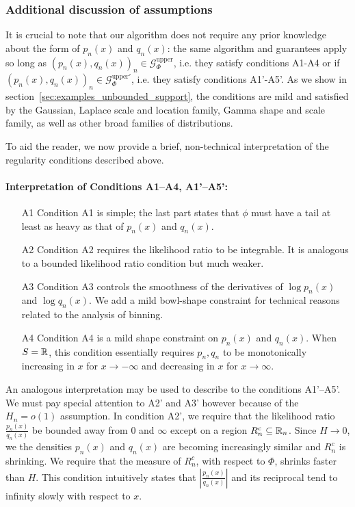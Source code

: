 \documentclass{article}
\begin{document}
\subsubsection{Additional discussion of assumptions}

It is crucial to note that our algorithm does not require any prior knowledge about the form of $p_n(x)$ and $q_n(x)$: the same algorithm and guarantees apply so long as $(p_n(x), q_n(x))_n \in \mathcal{G}^{\textrm{upper}}_\Phi$, i.e. they satisfy conditions A1-A4 or if  $(p_n(x), q_n(x))_n \in \mathcal{G}^{\textrm{upper}\prime}_\Phi$, i.e. they satisfy conditions A1'-A5'. As we show in section~\ref{sec:examples_unbounded_support}, the conditions are mild and satisfied by the Gaussian, Laplace scale and location family, Gamma shape and scale family, as well as other broad families of distributions.

To aid the reader, we now provide a brief, non-technical interpretation of the regularity conditions described above.

\paragraph{\textbf{Interpretation of Conditions A1--A4, A1'--A5':}}

\begin{enumerate}
\item[A1] Condition A1 is simple; the last part states that $\phi$ must have a tail at least as heavy as that of $p_n(x)$ and $q_n(x)$. 
\item[A2] Condition A2 requires the likelihood ratio to be integrable. It is analogous to a bounded likelihood ratio condition but much weaker.
\item[A3] Condition A3 controls the smoothness of the derivatives of $\log p_n(x)$ and $\log q_n(x)$. We add a mild bowl-shape constraint for technical reasons related to the analysis of binning. 
\item[A4]  Condition A4 is a mild shape constraint on $p_n(x)$ and $q_n(x)$. When $S={\mathbb R}$, this condition essentially requires $p_n, q_n$ to be monotonically increasing in $x$ for $x \rightarrow -\infty$ and decreasing in $x$ for $x \rightarrow \infty$.
\end{enumerate}

An analogous interpretation may be used to describe to the conditions A1'--A5'. We must pay special attention to A2' and A3' however because of the $H_n = o(1)$ assumption. In condition A2', we require that the likelihood ratio $\frac{p_n(x)}{q_n(x)}$ be bounded away from 0 and $\infty$ except on a region $ R_n^c \subseteq {\mathbb R}_n$. Since $H \rightarrow 0$, we the densities $p_n(x)$ and $q_n(x)$ are becoming increasingly similar and $R_n^c$ is shrinking. We require that the measure of $R_n^c$, with respect to $\Phi$, shrinks faster than $H$. This condition intuitively states that $|\frac{p_n(x)}{q_n(x)}|$ and its reciprocal tend to infinity slowly with respect to $x$. %
\end{document}
